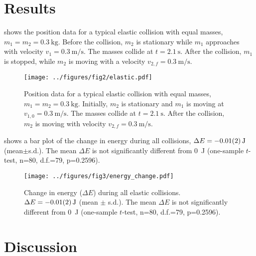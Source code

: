 \documentclass[aps,prl,preprint]{revtex4-1}
\begin{document}
\section{Results}
 shows the position data for a typical elastic collision with equal masses, $m_1=m_2=\qty{0.3}{\kilo\gram}$. Before the collision, $m_2$ is stationary while $m_1$ approaches with velocity $v_1=\qty{0.3}{\meter\per\second}$. The masses collide at $t=\qty{2.1}{\second}$. After the collision, $m_1$ is stopped, while $m_2$ is moving with a velocity $v_{2,f}=\qty{0.3}{\meter\per\second}$. 
\begin{figure}
\begin{center}
\texttt{[image: ../figures/fig2/elastic.pdf]}
\end{center}
\caption{Position data for a typical elastic collision with equal masses, $m_1=m_2=\qty{0.3}{\kilo\gram}$. Initially, $m_2$ is stationary and $m_1$ is moving at $v_{1,0}=\qty{0.3}{\meter\per\second}$. The masses collide at $t=\SI{2.1}{\second}$. After the collision, $m_2$ is moving with velocity $v_{2,f}=\qty{0.3}{\meter\per\second}$. }
\label{fig:results1}
\end{figure}

 shows a bar plot of the change in energy during all collisions, $\Delta E = \qty{-0.01\pm0.02}{\joule}$ (mean$\pm$s.d.). The mean $\Delta E$ is not significantly different from \qty{0}{\joule} (one-sample $t$-test, n=80, d.f.=79, p=0.2596). 
\begin{figure}
\begin{center}
\texttt{[image: ../figures/fig3/energy\_change.pdf]}
\end{center}
\caption{Change in energy ($\Delta E$) during all elastic collisions. $\Delta E = \qty{-0.01\pm0.02}{\joule}$ (mean $\pm$ s.d.). The mean $\Delta E$ is not significantly different from \qty{0}{\joule} (one-sample $t$-test, n=80, d.f.=79, p=0.2596).}
\label{fig:results2}
\end{figure}

\section{Discussion}
\end{document}
